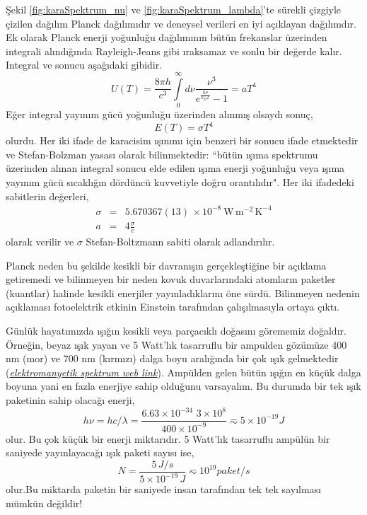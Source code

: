 \documentclass[a4paper,12pt, twoside]{article}
\begin{document}
Şekil \ref{fig:karaSpektrum_nu} ve \ref{fig:karaSpektrum_lambda}'te sürekli çizgiyle çizilen dağılım Planck dağılımıdır ve deneysel verileri en iyi açıklayan dağılımdır. Ek olarak Planck enerji yoğunluğu dağılımının bütün frekanslar üzerinden integrali alındığında Rayleigh-Jeans gibi ıraksamaz ve sonlu bir değerde kalır. Integral ve sonucu aşağıdaki gibidir.
\begin{equation}
\label{eq:Planck_U_total}
U(T) = \frac{8 \pi h}{c^{3}} \int\limits_0^\infty d\nu \frac{\nu^{3}}{e^{\frac{h \nu}{k_{B} T}} - 1} = a T^4
\end{equation}
Eğer integral yayınım gücü yoğunluğu üzerinden alınmış olsaydı sonuç,
\begin{equation}
\label{eq:Planck_E_total}
E(T) = \sigma T^4
\end{equation}
olurdu. Her iki ifade de karacisim ışınımı için benzeri bir sonucu ifade etmektedir ve Stefan-Bolzman yasası olarak bilinmektedir: ``bütün ışıma spektrumu üzerinden alınan integral sonucu elde edilen ışıma enerji yoğunluğu veya ışıma yayınım gücü sıcaklığın dördüncü kuvvetiyle doğru orantılıdır". Her iki ifadedeki sabitlerin değerleri,
\begin{eqnarray}
\label{eq:stefan_boltzman}
\sigma &=&  5.670367(13) \, \times 10^{-8}\ \textrm{W}\,\textrm{m}^{-2}\,\textrm{K}^{-4} \\
a &=& 4\frac{\sigma}{c} \nonumber
\end{eqnarray}
olarak verilir ve $\sigma$ Stefan-Boltzmann sabiti \cite{codata:stefan_boltzman} olarak adlandırılır.


Planck neden bu şekilde kesikli bir davranışın gerçekleştiğine bir açıklama getiremedi ve bilinmeyen bir neden kovuk duvarlarındaki atomların paketler (kuantlar) halinde kesikli enerjiler yayınladıklarını öne sürdü. Bilinmeyen nedenin açıklaması fotoelektrik etkinin Einstein tarafından çalışılmasıyla ortaya çıktı.

Günlük hayatımızda ışığın kesikli veya parçacıklı doğasını görememiz doğaldır. Örneğin, beyaz ışık yayan ve 5 Watt'lık tasarruflu bir ampulden gözümüze 400 nm (mor) ve 700 nm (kırmızı) dalga boyu aralığında bir çok ışık gelmektedir ({\it \href {https://upload.wikimedia.org/wikipedia/commons/2/25/Electromagnetic-Spectrum.svg}{elektromanyetik spektrum web link}}). Ampülden gelen bütün ışığın en küçük dalga boyuna yani en fazla enerjiye sahip olduğunu varsayalım. Bu durumda bir tek ışık paketinin sahip olacağı enerji,
\begin{equation}
\label{eq:example_light_quanta01}
h\nu = h c/\lambda = \frac{6.63\times10^{-34}\,\,3\times10^{8}}{400\times10^{-9}} \eqsim 5\times 10^{-19} J 
\end{equation}
olur. Bu çok küçük bir enerji miktarıdır. 5 Watt'lık tasarruflu ampülün bir saniyede yayınlayacağı ışık paketi sayısı ise,
\begin{equation}
\label{eq:example_light_quanta02}
N = \frac{5\,J/s}{5\times10^{-19}\,J} \eqsim 10^{19} paket/s
\end{equation}
olur.Bu miktarda paketin bir saniyede insan tarafından tek tek sayılması mümkün değildir!
\end{document}
